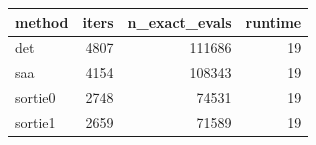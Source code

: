 \begin{tabular}{lrrr}
\toprule
method & iters & n_exact_evals & runtime \\
\midrule
det & 4807 & 111686 & 19 \\
saa & 4154 & 108343 & 19 \\
sortie0 & 2748 & 74531 & 19 \\
sortie1 & 2659 & 71589 & 19 \\
\bottomrule
\end{tabular}
